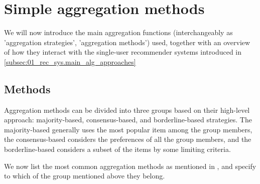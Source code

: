 \section{Simple aggregation methods}\label{sec:03_simple_aggregation_metods}
We will now introduce the main aggregation functions (interchangeably as 'aggregation strategies', 'aggregation methods') used, together with an overview of how they interact with the single-user recommender systems introduced in \ref{subsec:01_rec_sys.main_alg_approaches}
\subsection{Methods}\label{subsec:03_simple_aggregation_methods.methods}

Aggregation methods can be divided into three groups based on their high-level approach: majority-based, consensus-based, and borderline-based strategies. The majority-based generally uses the most popular item among the group members, the consensus-based considers the preferences of all the group members, and the borderline-based considers a subset of the items by some limiting criteria.

We now list the most common aggregation methods as mentioned in \cite{grouprecommendersystems_felfernig2018group}, \cite{masthoff_2011_group_rec_systems} and \cite{masthoff_2004_group_modeling} specify to which of the group mentioned above they belong.

